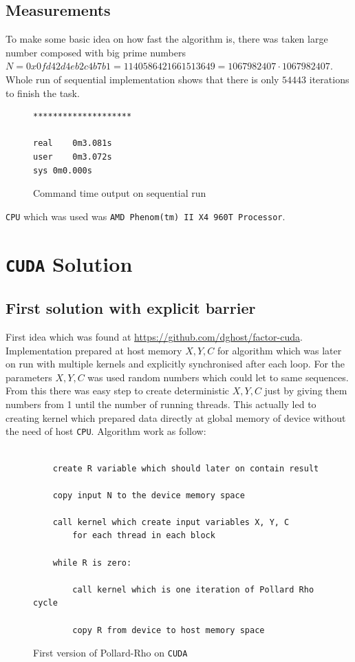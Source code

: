 \documentclass[a4paper]{article}
\begin{document}
\subsection{Measurements}

To make some basic idea on how fast the algorithm is, there was taken large number composed with big prime numbers $N = 0x0fd42d4eb2c4b7b1 = 1140586421661513649 = 1067982407 \cdot 1067982407$. Whole run of sequential implementation shows that there is only $54443$ iterations to finish the task.


\begin{figure}[H]
	\centering
	\begin{lstlisting}[language=sh,basicstyle=\small]
********************

real	0m3.081s
user	0m3.072s
sys	0m0.000s
	\end{lstlisting}
	\caption{Command time output on sequential run}
	\label{tmsq}
\end{figure}

\texttt{CPU} which was used was \texttt{AMD Phenom(tm) II X4 960T Processor}.

\section{\texttt{CUDA} Solution}


\subsection{First solution with explicit barrier}

First idea which was found at \url{https://github.com/dghost/factor-cuda}. Implementation prepared at host memory $X, Y, C$ for algorithm which was later on run with multiple kernels and explicitly synchronised after each loop. For the parameters $X, Y, C$ was used random numbers which could let to same sequences. From this there was easy step to create deterministic $X, Y, C$ just by giving them numbers from 1 until the number of running threads. This actually led to creating kernel which prepared data directly at global memory of device without the need of host \texttt{CPU}. Algorithm work as follow:

\begin{figure}[H]
	\centering
	\begin{lstlisting}

	create R variable which should later on contain result

	copy input N to the device memory space

	call kernel which create input variables X, Y, C
		for each thread in each block

	while R is zero:
		
		call kernel which is one iteration of Pollard Rho cycle

		copy R from device to host memory space

	\end{lstlisting}
	\caption{First version of Pollard-Rho on \texttt{CUDA}}
	\label{gcd}
\end{figure}
\end{document}
